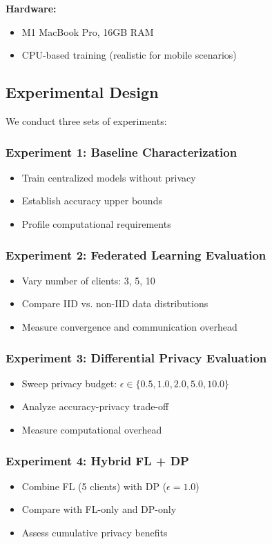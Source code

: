 \documentclass[conference]{IEEEtran}
\begin{document}
\textbf{Hardware:}
\begin{itemize}
    \item M1 MacBook Pro, 16GB RAM
    \item CPU-based training (realistic for mobile scenarios)
\end{itemize}

\subsection{Experimental Design}

We conduct three sets of experiments:

\subsubsection{Experiment 1: Baseline Characterization}
\begin{itemize}
    \item Train centralized models without privacy
    \item Establish accuracy upper bounds
    \item Profile computational requirements
\end{itemize}

\subsubsection{Experiment 2: Federated Learning Evaluation}
\begin{itemize}
    \item Vary number of clients: 3, 5, 10
    \item Compare IID vs. non-IID data distributions
    \item Measure convergence and communication overhead
\end{itemize}

\subsubsection{Experiment 3: Differential Privacy Evaluation}
\begin{itemize}
    \item Sweep privacy budget: $\epsilon \in \{0.5, 1.0, 2.0, 5.0, 10.0\}$
    \item Analyze accuracy-privacy trade-off
    \item Measure computational overhead
\end{itemize}

\subsubsection{Experiment 4: Hybrid FL + DP}
\begin{itemize}
    \item Combine FL (5 clients) with DP ($\epsilon=1.0$)
    \item Compare with FL-only and DP-only
    \item Assess cumulative privacy benefits
\end{itemize}
\end{document}
